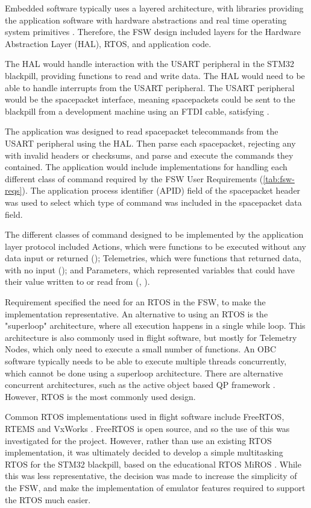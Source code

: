 \documentclass[../report.tex]{subfiles}
\begin{document}
Embedded software typically uses a layered architecture, with libraries
providing the application software with hardware abstractions and real time
operating system primitives \citep{Cratere_2024}. Therefore, the FSW design
included layers for the Hardware Abstraction Layer (HAL), RTOS, and application
code.

The HAL would handle interaction with the USART peripheral in the STM32
blackpill, providing functions to read and write data. The HAL would need to be
able to handle interrupts from the USART peripheral. The USART peripheral would
be the spacepacket interface, meaning spacepackets could be sent to the
blackpill from a development machine using an FTDI cable, satisfying
.

The application was designed to read spacepacket telecommands from the USART
peripheral using the HAL. Then parse each spacepacket, rejecting any with
invalid headers or checksums, and parse and execute the commands they
contained. The application would include implementations for handling each
different class of command required by the FSW User Requirements
(\autoref{tab:fsw-reqs}). The application process identifier (APID) field of
the spacepacket header \citep{Ccsds_spp} was used to select which type of
command was included in the spacepacket data field.

The different classes of command designed to be implemented by the application
layer protocol included Actions, which were functions to be executed without
any data input or returned (); Telemetries, which were functions
that returned data, with no input (); and Parameters, which
represented variables that could have their value written to or read from
(, ).

Requirement  specified the need for an RTOS in the FSW, to make
the implementation representative. An alternative to using an RTOS is the
"superloop" architecture, where all execution happens in a single while loop.
This architecture is also commonly used in flight software, but mostly for
Telemetry Nodes, which only need to execute a small number of functions. An OBC
software typically needs to be able to execute multiple threads concurrently,
which cannot be done using a superloop architecture. There are alternative
concurrent architectures, such as the active object based QP framework
\citep{QP}. However, RTOS is the most commonly used design.

Common RTOS implementations used in flight software include FreeRTOS, RTEMS and
VxWorks \citep{Cratere_2024}. FreeRTOS is open source, and so the use of this
was investigated for the project. However, rather than use an existing RTOS
implementation, it was ultimately decided to develop a simple multitasking RTOS
for the STM32 blackpill, based on the educational RTOS MiROS \citep{miros}.
While this was less representative, the decision was made to increase the
simplicity of the FSW, and make the implementation of emulator features
required to support the RTOS much easier.
\end{document}
